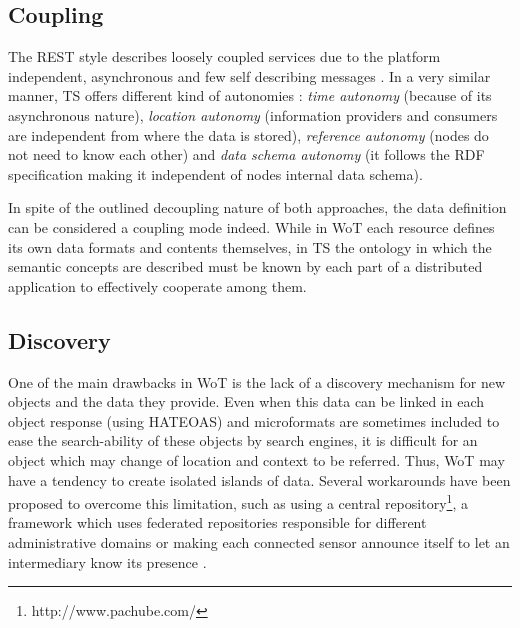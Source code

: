 \subsection{Coupling}
\label{sec:coupling}
The REST style describes loosely coupled services due to the platform independent, asynchronous and few self describing messages
\cite{pautasso_why_2009}. In a very similar manner, TS offers different kind of autonomies \cite{krummenacher_www_2005}:
\textit{time autonomy} (because of its asynchronous nature), \textit{location autonomy} (information providers and consumers are independent
from where the data is stored), \textit{reference autonomy} (nodes do not need to know each other) and
\textit{data schema autonomy} (it follows the RDF specification making it independent of nodes internal data schema).

In spite of the outlined decoupling nature of both approaches, the data definition can be considered a coupling mode indeed.
While in WoT each resource defines its own data formats and contents themselves, in TS the ontology in which the semantic
concepts are described must be known by each part of a distributed application to effectively cooperate among them.

\subsection{Discovery}
One of the main drawbacks in WoT is the lack of a discovery mechanism for new objects and the data they provide. Even when this data can be linked
in each object response (using HATEOAS) and microformats are sometimes included to ease the search-ability of these objects by search engines, it is difficult for an
object which may change of location and context to be referred. Thus, WoT may have a tendency to create isolated islands of data. Several workarounds
have been proposed to overcome this limitation, such as using a central repository\footnote{http://www.pachube.com/}, a framework which uses federated
repositories responsible for different administrative domains \cite{stirbu_towards_2008} or making each connected sensor announce itself to let an
intermediary know its presence \cite{kamilaris_smart_2010}.

